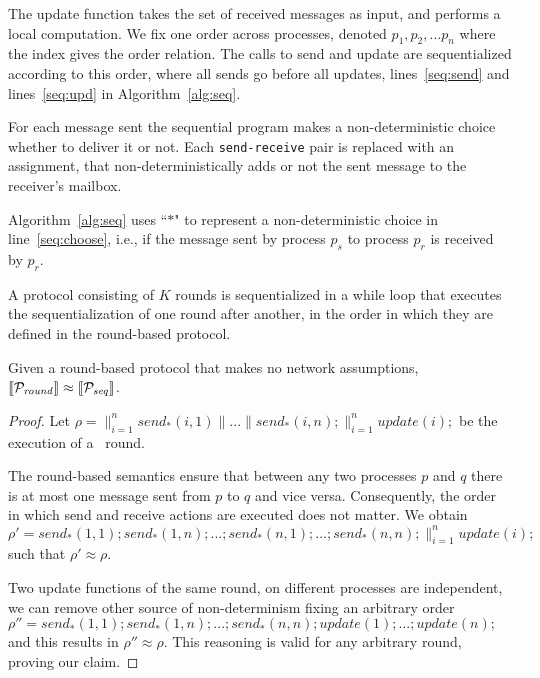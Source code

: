 The update function takes the set of received messages as input, and performs a local computation. We fix one order across processes, denoted  $p_1, p_2, \ldots p_n$ where the index gives the order relation.
The calls to send and update are sequentialized according to this order, where all sends go before all updates, lines~\ref{seq:send} and lines~\ref{seq:upd} in Algorithm~\ref{alg:seq}. 

For each message sent the sequential program makes a non-deterministic choice whether to deliver it or not. 
Each \texttt{send-receive} pair is replaced with an assignment, that non-deterministically adds or not the sent message to the receiver's mailbox.

Algorithm~\ref{alg:seq} uses ``$*$" to represent a non-deterministic choice in  line~\ref{seq:choose}, i.e., if the message sent by process $p_s$ to process $p_r$ is received by $p_r$. 

A protocol consisting of $K$ rounds is sequentialized in a while loop that executes the sequentialization of one round after another, in the order in which they are defined in the round-based protocol. 

\begin{proposition}
    Given a round-based protocol that makes no network assumptions, $\llbracket \mathcal{P}_{\mathit{round}} \rrbracket \approx \llbracket \mathcal{P}_{\mathit{seq}} \rrbracket$.
\label{propo:sync:equiv:seq}
\end{proposition}

\begin{proof}
    Let $\rho = \parallel^{n}_{i=1} send_*(i,1) \parallel ... \parallel send_*(i,n); \parallel^{n}_{i=1} update(i);$ be the execution of a \Psync\ round.

    The round-based semantics ensure that between any two processes $p$ and $q$ there is at most one message sent from $p$ to $q$ and vice versa.  
Consequently, the order in which send and receive actions are executed does not matter. We obtain $\rho' = send_*(1,1); send_*(1,n); ... ; send_*(n,1); ...; send_*(n,n); \parallel^{n}_{i=1} update(i);$ such that $\rho' \approx \rho$.

Two update functions of the same round, on different processes are independent, we can remove other source of non-determinism fixing an arbitrary order $\rho'' = send_*(1,1); send_*(1,n); ... ; send_*(n,n); update(1); ... ; update(n);$ and this results in $\rho'' \approx \rho$. This reasoning is valid for any arbitrary round, proving our claim.
\end{proof}

